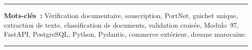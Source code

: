 \noindent\rule[2pt]{\textwidth}{0.5pt}

{\textbf{Mots-cl\'{e}s~:}} V\'{e}rification documentaire, souscription, PortNet, guichet unique, extraction de texte, classification de documents, validation crois\'{e}e, Modulo~97, FastAPI, PostgreSQL, Python, Pydantic, commerce ext\'{e}rieur, douane marocaine.

\noindent\rule[2pt]{\textwidth}{0.5pt}
\endgroup
